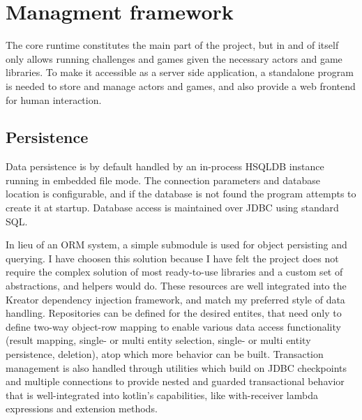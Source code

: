 





%

\chapter{Managment framework}\label{sect:Web}

The core runtime constitutes the main part of the project, but in and of itself only allows running challenges and games given the necessary actors and game libraries. To make it accessible as a server side application, a standalone program is needed to store and manage actors and games, and also provide a web frontend for human interaction.

	\section{Persistence}
	
	Data persistence is by default handled by an in-process HSQLDB instance running in embedded file mode. The connection parameters and database location is configurable, and if the database is not found the program attempts to create it at startup. Database access is maintained over JDBC using standard SQL.
		
	In lieu of an ORM system, a simple submodule is used for object persisting and querying. I have choosen this solution because I have felt the project does not require the complex solution of most ready-to-use libraries and a custom set of abstractions, and helpers would do. These resources are well integrated into the Kreator dependency injection framework, and match my preferred style of data handling. Repositories can be defined for the desired entites, that need only to define two-way object-row mapping to enable various data access functionality (result mapping, single- or multi entity selection, single- or multi entity persistence, deletion), atop which more behavior can be built. Transaction management is also handled through utilities which build on JDBC checkpoints and multiple connections to provide nested and guarded transactional behavior that is well-integrated into kotlin's capabilities, like with-receiver lambda expressions and extension methods.

